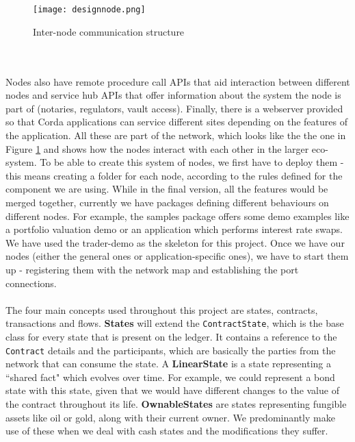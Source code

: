 \documentclass[12pt,twoside]{article}
\begin{document}
\\ \\
\begin{figure}[!htb]
\centering
\texttt{[image: designnode.png]}
\caption{Inter-node communication structure \cite{nodestruct}}
\centering
\label{fig:system}
\end{figure}
\\ \\
Nodes also have remote procedure call APIs that aid interaction between different nodes and service hub APIs that offer information about the system the node is part of (notaries, regulators, vault access). Finally, there is a webserver provided so that Corda applications can service different sites depending on the features of the application. All these are part of the network, which looks like the the one in Figure \ref{fig:system} and shows how the nodes interact with each other in the larger eco-system. To be able to create this system of nodes, we first have to deploy them - this means creating a folder for each node, according to the rules defined for the component we are using. While in the final version, all the features would be merged together, currently we have packages defining different behaviours on different nodes. For example, the samples package offers some demo examples like a portfolio valuation demo or an application which performs interest rate swaps. We have used the trader-demo as the skeleton for this project. Once we have our nodes (either the general ones or application-specific ones), we have to start them up - registering them with the network map and establishing the port connections.
\\ \\
The four main concepts used throughout this project are states, contracts, transactions and flows. \textbf{States} will extend the \verb|ContractState|, which is the base class for every state that is present on the ledger. It contains a reference to the \verb|Contract| details and the participants, which are basically the parties from the network that can consume the state. A \textbf{LinearState} is a state representing a ``shared fact" which evolves over time. For example, we could represent a bond state with this state, given that we would have different changes to the value of the contract throughout its life. \textbf{OwnableStates} are states representing fungible assets like oil or gold, along with their current owner. We predominantly make use of these when we deal with cash states and the modifications they suffer.
\\ \\
\end{document}
